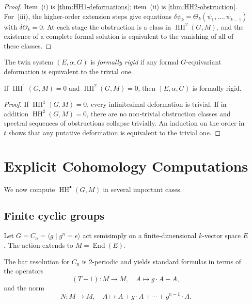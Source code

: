 \documentclass[11pt,a4paper]{article}
\numberwithin{equation}{section}
\DeclareMathOperator{\End}{End}
\DeclareMathOperator{\HH}{HH}
\newcommand{\TwinSpace}{(E,\alpha,G)}
\newcommand{\diff}{\delta}
\begin{document}
	\begin{proof}
		Item~(i) is \cref{thm:HH1-deformations}; item~(ii) is \cref{thm:HH2-obstruction}.
		For~(iii), the higher-order extension steps give equations
		$\diff \psi_k = \Theta_k(\psi_1,\dots,\psi_{k-1})$ with $\diff\Theta_k=0$.
		At each stage the obstruction is a class in $\HH^2(G,M)$, and the existence of a complete formal solution
		is equivalent to the vanishing of all of these classes.
	\end{proof}
	
	\begin{definition}
		The twin system $\TwinSpace$ is \emph{formally rigid} if any formal $G$-equivariant deformation
		is equivalent to the trivial one.
	\end{definition}
	
	\begin{theorem}\label{thm:cohom-rigidity}
		If $\HH^1(G,M)=0$ and $\HH^2(G,M)=0$, then $\TwinSpace$ is formally rigid.
	\end{theorem}
	
	\begin{proof}
		If $\HH^1(G,M)=0$, every infinitesimal deformation is trivial.
		If in addition $\HH^2(G,M)=0$, there are no non-trivial obstruction classes and spectral
		sequences of obstructions collapse trivially. An induction on the order in $t$ shows that any
		putative deformation is equivalent to the trivial one.
	\end{proof}
	
	\section{Explicit Cohomology Computations}
	\label{sec:explicit}
	
	We now compute $\HH^\bullet(G,M)$ in several important cases.
	
	\subsection{Finite cyclic groups}
	
	Let $G=C_n=\langle g\mid g^n=e\rangle$ act semisimply on a finite-dimensional $k$-vector space $E$.
	The action extends to $M=\End(E)$.
	
	The bar resolution for $C_n$ is 2-periodic and yields standard formulas in terms of
	the operators
	\[
	(T-1) : M\to M,\quad A\mapsto g\cdot A - A,
	\]
	and the norm
	\[
	N : M\to M,\quad A\mapsto A + g\cdot A + \cdots + g^{n-1}\cdot A.
	\]
	
\end{document}
